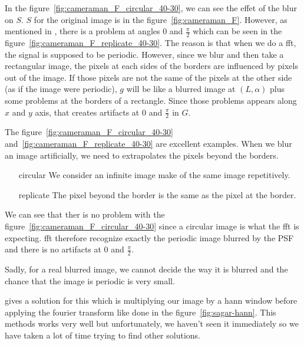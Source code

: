 In the figure~\ref{fig:cameraman_F_circular_40-30},
we can see the effet of the blur on $S$.
$S$ for the original image is in the
figure~\ref{fig:cameraman_F}.
However, as mentioned in \cite{krahmer2006blind},
there is a problem at angles 0 and $\frac{\pi}{2}$ which
can be seen in the figure~\ref{fig:cameraman_F_replicate_40-30}.
The reason is that when we do a fft,
the signal is supposed to be periodic.
However, since we blur and then take a rectangular image,
the pixels at each sides of the borders are influenced
by pixels out of the image.
If those pixels are not the same of the pixels at the other side
(as if the image were periodic),
$g$ will be like a blurred image at $(L,\alpha)$ plus
some problems at the borders of a rectangle.
Since those problems appears along $x$ and $y$ axis,
that creates artifacts at $0$ and $\frac{\pi}{2}$ in $G$.

The figure~\ref{fig:cameraman_F_circular_40-30}
and~\ref{fig:cameraman_F_replicate_40-30} are excellent
examples.
When we blur an image artificially, we need to extrapolates
the pixels beyond the borders.
\begin{enumerate}
  \item[circular] We consider an infinite image make of
    the same image repetitively.
  \item[replicate] The pixel beyond the border is the
    same as the pixel at the border.
\end{enumerate}
We can see that ther is no problem with
the figure~\ref{fig:cameraman_F_circular_40-30}
since a circular image is what the fft is expecting.
fft therefore recognize exactly the periodic image
blurred by the PSF and there is no artifacts
at 0 and $\frac{\pi}{2}$.

Sadly, for a real blurred image, we cannot decide the
way it is blurred and the chance that the image is
periodic is very small.

\cite{krahmer2006blind} gives a solution for this
which is multiplying our image by a hann window before
applying the fourier transform like done
in the figure~\ref{fig:sagar-hann}.
This methods works very well but unfortunately,
we haven't seen it immediately so we have taken a lot
of time trying to find other solutions.

